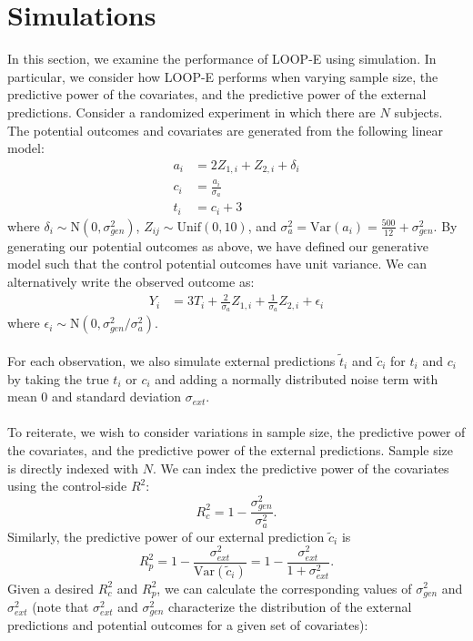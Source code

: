 
\section{Simulations}
In this section, we examine the performance of LOOP-E using simulation. In particular, we consider how LOOP-E performs when varying sample size, the predictive power of the covariates, and the predictive power of the external predictions. Consider a randomized experiment in which there are $N$ subjects. The potential outcomes and covariates are generated from the following linear model:
\begin{align*}
a_i &= 2Z_{1,i} + Z_{2,i} + \delta_i \\
c_i &= \frac{ a_i }{ \sigma_{a} } \\
t_i &= c_i + 3
\end{align*}
where $\delta_i \sim \text{N}(0,\sigma_{gen}^2)$, $Z_{ij} \sim \text{Unif}(0,10)$, and $\sigma^2_{a} = \text{Var}(a_i) = \frac{500}{12} + \sigma_{gen}^2$. By generating our potential outcomes as above, we have defined our generative model such that the control potential outcomes have unit variance. We can alternatively write the observed outcome as:
\begin{align*}
Y_i &= 3 T_i + \frac{2}{\sigma_{a}}Z_{1,i} + \frac{1}{\sigma_{a}} Z_{2,i} + \epsilon_i
\end{align*}
where $\epsilon_i \sim \text{N}(0,\sigma_{gen}^2/\sigma^2_{a})$.
\\\\
For each observation, we also simulate external predictions $\tilde{t}_i$ and $\tilde{c}_i$ for $t_i$ and $c_i$ by taking the true $t_i$ or $c_i$ and adding a normally distributed noise term with mean 0 and standard deviation $\sigma_{ext}$. 
\\\\
To reiterate, we wish to consider variations in sample size, the predictive power of the covariates, and the predictive power of the external predictions. Sample size is directly indexed with $N$. We can index the predictive power of the covariates using the control-side $R^2$:
\[ R_c^2 = 1 - \frac{ \sigma^2_{gen} }{ \sigma^2_{a} }. \]
Similarly, the predictive power of our external prediction $\tilde{c}_i$ is
\[ R^2_{p} = 1 - \frac{\sigma_{ext}^2}{\text{Var}( \tilde{c}_i )} = 1 - \frac{\sigma^2_{ext}}{1+\sigma^2_{ext}}. \]
Given a desired $R_c^2$ and $R^2_{p}$, we can calculate the corresponding values of $\sigma^2_{gen}$ and $\sigma^2_{ext}$ (note that $\sigma_{ext}^2$ and $\sigma_{gen}^2$ characterize the distribution of the external predictions and potential outcomes for a given set of covariates):
